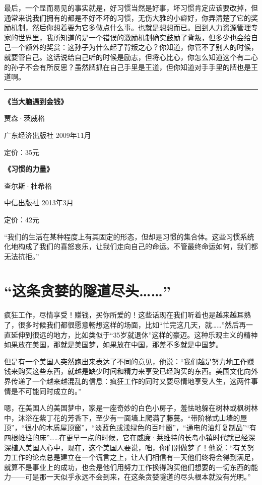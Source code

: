 最后，一个显而易见的事实就是，好习惯当然是好事，坏习惯肯定应该要改掉，但通常来说我们拥有的都是不好不坏的习惯，无伤大雅的小癖好，你弄清楚了它的奖励机制，然后你想着要为它多做点什么事。也就是想想而已。回到人力资源管理专家的世界里，我所知道的是一个错误的激励机制确实鼓励了背叛，但多少也会给自己一个额外的奖赏：这孙子为什么起了背叛之心？你知道，你管不了别人的时候，就要管自己。这话说给自己听的时候是励志，但将心比心，你怎么知道这个有二心的孙子不会有所反思？虽然牌抓在自己手里是王道，但你知道对手手里的牌也是王道啊。

\begin{center}\rule{0.5\linewidth}{0.5pt}\end{center}

\textbf{《当大脑遇到金钱》}

贾森·茨威格

广东经济出版社 2009年11月

定价：35元

\textbf{《习惯的力量》}

查尔斯·杜希格

中信出版社 2013年3月

定价：42元

``我们的生活在某种程度上有其固定的形态，但却是习惯的集合体。这些习惯系统化地构成了我们的喜怒哀乐，让我们走向自己的命运。不管最终命运如何，我们都无法抗拒。''

\hypertarget{ux8fd9ux6761ux8d2aux5a6aux7684ux96a7ux9053ux5c3dux5934}{%
\section{\texorpdfstring{``这条贪婪的隧道尽头\ldots\ldots{}''}{``这条贪婪的隧道尽头\ldots\ldots''}}\label{ux8fd9ux6761ux8d2aux5a6aux7684ux96a7ux9053ux5c3dux5934}}

疯狂工作，尽情享受！赚钱，买你所爱的！这些话现在我们听着也是越来越耳熟了，很多时候我们都很愿意畅想这样的场面，比如``忙完这几天，就\ldots\ldots''然后再一直延伸到很远的地方，比如类似于``35岁就退休''这样的豪迈。这种乐观主义的精神如果放在美国，那就是美国梦，如果放在中国，那差不多就是中国梦。

但是有一个美国人突然跑出来表达了不同的意见，他说：``我们越是努力地工作赚钱来购买这些东西，就越是缺少时间和精力来享受已经购买的东西。美国文化向外界传递了一个越来越混乱的信息：疯狂工作的同时又要尽情地享受人生，这两件事情是不可能同时成立的。''

嗯，在美国人的美国梦中，家是一座奇妙的白色小房子，羞怯地躲在树林或枫树林中，沐浴在紫丁花的芳香下，至少有一面墙上爬满了藤蔓。``带阶梯式山墙的屋顶''，``很小的木质屋顶窗''，``淡蓝色或浅绿色的百叶窗''，``通电的油灯复制品''``有四根帷柱的床''\ldots\ldots 在更早一点的时候，它在威廉·莱维特的长岛小镇时代就已经深深植入美国人心中，现在，这个美国人要说，咄，你们别做梦了！他说：``有关努力工作的论点总是建立在一个谎言之上，让人们相信有一天他们终将会得到满足，就算不是事业上的成功，也会是他们用努力工作换得购买他们想要的一切东西的能力------可是那一天似乎永远不会到来，在这条贪婪隧道的尽头根本就没有光明。''

